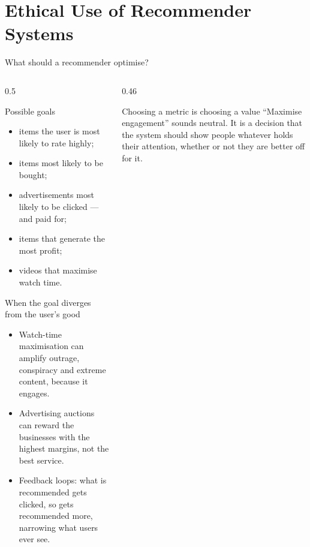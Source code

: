 \documentclass[aspectratio=169,10pt]{beamer}
\begin{document}
\section{Ethical Use of Recommender Systems}

\begin{frame}{What should a recommender optimise?}
  \begin{columns}[T,onlytextwidth]
    \begin{column}{0.5\textwidth}
      \footnotesize
      \begin{block}{Possible goals}
        \begin{itemize}
          \item items the user is most likely to rate highly;
          \item items most likely to be bought;
          \item advertisements most likely to be clicked --- and paid for;
          \item items that generate the most profit;
          \item videos that maximise watch time.
        \end{itemize}
      \end{block}
      \begin{block}{When the goal diverges from the user's good}
        \begin{itemize}
          \item Watch-time maximisation can amplify outrage, conspiracy and extreme
                content, because it engages.
          \item Advertising auctions can reward the businesses with the highest margins,
                not the best service.
          \item Feedback loops: what is recommended gets clicked, so gets recommended
                more, narrowing what users ever see.
        \end{itemize}
      \end{block}
    \end{column}
    \begin{column}{0.46\textwidth}
      \begin{alertblock}{Choosing a metric is choosing a value}
        \footnotesize ``Maximise engagement'' sounds neutral. It is a decision that the
        system should show people whatever holds their attention, whether or not they
        are better off for it.
      \end{alertblock}

\end{column}
\end{columns}
\end{frame}
\end{document}
